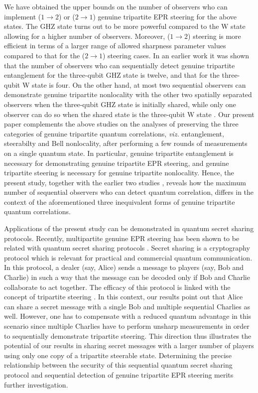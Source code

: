 \documentclass[pra,a4paper,aps,twocolumn,showpacs,superscriptaddress,groupedaddress]{revtex4}
\begin{document}
We have obtained the upper bounds on the number of observers who can implement  ($1 \rightarrow 2$) or ($2 \rightarrow 1$) genuine tripartite EPR steering for the above states. The GHZ state turns out to be more powerful compared to the W state allowing for a higher number of observers. Moreover, ($1\rightarrow 2$) steering is more efficient in terms of a larger range of allowed sharpness parameter values compared to that for the ($2 \rightarrow 1$) steering cases. In an earlier work \cite{Maity2} it was shown that the number of observers who can sequentially detect genuine tripartite entanglement for the three-qubit GHZ state is  twelve, and that for the three-qubit W state is four. On the other hand,  at most two sequential observers can demonstrate genuine tripartite nonlocality with the other two spatially separated observers  when the three-qubit GHZ state is initially shared, while only one observer can do so when the shared state is the three-qubit W state \cite{Saha}.  Our present paper complements the above studies \cite{Saha, Maity2} on the analyses of preserving the three categories of genuine tripartite quantum correlations, {\it viz.} entanglement, steerabilty and Bell nonlocality,  after performing a few rounds of measurements on a single quantum state.  In particular, genuine tripartite entanglement is necessary for demonstrating genuine tripartite EPR steering, and genuine tripartite steering is necessary for genuine tripartite nonlocality. Hence, the present study, together with the earlier two studies \cite{Saha, Maity2},  reveals how the maximum number of sequential observers who can detect  quantum correlation, differs in the context of the aforementioned three inequivalent forms of genuine tripartite quantum correlations. 

 Applications of the present study can  be demonstrated in quantum secret sharing protocols. Recently, multipartite genuine EPR steering has been shown to be related with quantum secret sharing protocols \cite{Hil}. Secret sharing is a cryptography protocol which is relevant for practical and commercial quantum communication. In this protocol, a dealer (say, Alice)  sends a message to players (say, Bob and Charlie) in  such a way that the message can be decoded only if Bob and Charlie collaborate to act together. The efficacy of this protocol is linked with the concept of tripartite steering \cite{Daniel,Armstrong2015,sss1,sss2}. In this context, our results point out that Alice can share a secret message with a single Bob and multiple sequential Charlies as well. However, one has to compensate with a reduced quantum advantage in this scenario since multiple Charlies have to perform unsharp measurements in order to sequentially demonstrate tripartite steering. This direction thus illustrates the potential of our results in sharing secret messages with a larger number of players using only one copy of a tripartite steerable state.  Determining the precise relationship between the security of this sequential quantum secret sharing protocol and sequential detection of genuine tripartite EPR steering merits further investigation.
\end{document}
